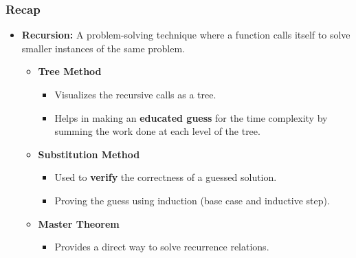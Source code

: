 
\begin{frame}
  \frametitle{Recap}
  \begin{itemize}

    \item \textbf{Recursion:} A problem-solving technique where a function calls itself to solve smaller instances of the same problem.
    
    \vspace{5pt}
    \begin{itemize}
        \item \textbf{Tree Method}  
         	\begin{itemize}
		        \item Visualizes the recursive calls as a tree.
		        \vspace{3pt}
		        \item Helps in making an   \textbf{educated guess} for the time complexity by summing the work done at each level of the tree.
    	    \end{itemize}
        \vspace{5pt}



        \item \textbf{Substitution Method} 
        \vspace{3pt}
        	\begin{itemize}
		        \item Used to \textbf{verify} the correctness of a guessed solution.
		        \vspace{3pt}
		        \item Proving the guess using induction (base case and inductive step).
    	    \end{itemize}
	    
	    
	    
        \vspace{5pt}
        \item \textbf{Master Theorem} 
                	\begin{itemize}
       	\item  Provides a direct way to solve recurrence relations.
	    	    \end{itemize}
    \end{itemize}
  \end{itemize}
\end{frame}

